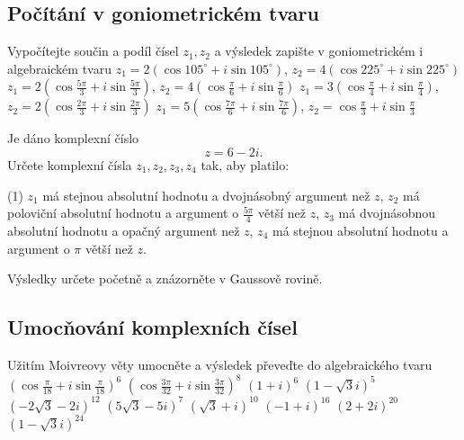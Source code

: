 
\subsection*{Počítání v goniometrickém tvaru}

\begin{exerciseblock}[1]{Vypočítejte součin a podíl čísel $z_1,z_2$ a výsledek zapište v goniometrickém i algebraickém tvaru}
    \task $z_1=2(\cos105^\circ+i\sin105^\circ)$, $z_2=4(\cos225^\circ+i\sin225^\circ)$
    \task $\displaystyle z_1=2\left(\cos\frac{5\pi}{3}+i\sin\frac{5\pi}{3}\right)$,
    $\displaystyle z_2=4\left(\cos\frac{\pi}{6}+i\sin\frac{\pi}{6}\right)$
    \task $\displaystyle z_1=3\left(\cos\frac{\pi}{4}+i\sin\frac{\pi}{4}\right)$,
    $\displaystyle z_2=2\left(\cos\frac{2\pi}{3}+i\sin\frac{2\pi}{3}\right)$
    \task $\displaystyle z_1=5\left(\cos\frac{7\pi}{6}+i\sin\frac{7\pi}{6}\right)$,
    $\displaystyle z_2=\cos\frac{\pi}{3}+i\sin\frac{\pi}{3}$
\end{exerciseblock}


\begin{exercise}{Je dáno komplexní číslo
\[
    z=6-2i.
\]
Určete komplexní čísla $z_1,z_2,z_3,z_4$ tak, aby platilo:}
    \begin{tasks}(1)
        \task $z_1$ má stejnou absolutní hodnotu a dvojnásobný argument než $z$,
        \task $z_2$ má poloviční absolutní hodnotu a argument o $\frac{5\pi}{4}$ větší než $z$,
        \task $z_3$ má dvojnásobnou absolutní hodnotu a opačný argument než $z$,
        \task $z_4$ má stejnou absolutní hodnotu a argument o $\pi$ větší než $z$.
    \end{tasks}

    Výsledky určete početně a znázorněte v Gaussově rovině.
\end{exercise}



\subsection*{Umocňování komplexních čísel}

\begin{exerciseblock}[2]{Užitím Moivreovy věty umocněte a výsledek převeďte do algebraického tvaru}
    \task $\displaystyle \left(\cos\frac{\pi}{18}+i\sin\frac{\pi}{18}\right)^6$
    \task $\displaystyle \left(\cos\frac{3\pi}{32}+i\sin\frac{3\pi}{32}\right)^8$
    \task $(1+i)^6$
    \task $(1-\sqrt3 i)^5$
    \task $(-2\sqrt3-2i)^{12}$
    \task $(5\sqrt3-5i)^7$
    \task $(\sqrt3+i)^{10}$
    \task $(-1+i)^{16}$
    \task $(2+2i)^{20}$
    \task $(1-\sqrt3 i)^{24}$
\end{exerciseblock}


